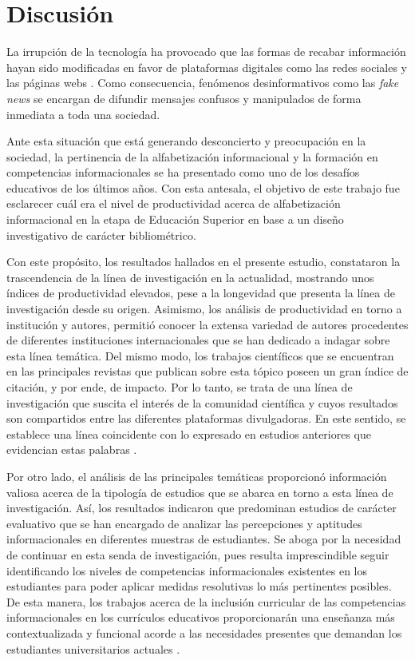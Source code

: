 \documentclass[spanish]{textolivre}
\begin{document}
\section{Discusión}
La irrupción de la tecnología ha provocado que las formas de recabar información hayan sido modificadas en favor de  plataformas digitales como las redes sociales y las páginas webs \cite{alonsoelat2020}. %
Como consecuencia, fenómenos desinformativos como las \emph{fake news} se encargan de difundir mensajes confusos y manipulados de forma inmediata a toda una sociedad.

Ante esta situación que está generando desconcierto y preocupación en la sociedad, la pertinencia de la alfabetización informacional y la formación en competencias informacionales se ha presentado como uno de los desafíos educativos de los últimos años. Con esta antesala, el objetivo de este trabajo fue esclarecer cuál era el nivel de productividad acerca de alfabetización informacional en la etapa de Educación Superior en base a un diseño investigativo de carácter bibliométrico.

Con este propósito, los resultados hallados en el presente estudio, constataron la trascendencia de la línea de investigación en la actualidad, mostrando unos índices de productividad elevados, pese a la longevidad que presenta la línea de investigación desde su origen. Asimismo, los análisis de productividad en torno a institución y autores, permitió conocer la extensa variedad de autores procedentes de diferentes instituciones internacionales que se han dedicado a indagar sobre esta línea temática. Del mismo modo, los trabajos científicos que se encuentran en las principales revistas que publican sobre esta tópico poseen un gran índice de citación, y por ende, de impacto. Por lo tanto, se trata de una línea de investigación que suscita el interés de la comunidad científica y cuyos resultados son compartidos entre las diferentes plataformas divulgadoras. En este sentido, se establece una línea coincidente con lo expresado en estudios anteriores que evidencian estas palabras \cite{demeulemeesteretal2019, demeulemeester2018}. %

Por otro lado, el análisis de las principales temáticas proporcionó información valiosa acerca de la tipología de estudios que se abarca en torno a esta línea de investigación. Así, los resultados indicaron que predominan estudios de carácter evaluativo que se han encargado de analizar las percepciones y aptitudes informacionales en diferentes muestras de estudiantes. Se aboga por la necesidad de continuar en esta senda de investigación, pues resulta imprescindible seguir identificando los niveles de competencias informacionales existentes en los estudiantes para poder aplicar medidas resolutivas lo más pertinentes posibles. De esta manera, los trabajos acerca de la inclusión curricular de las competencias informacionales en los currículos educativos proporcionarán una enseñanza más contextualizada y funcional acorde a las necesidades presentes que demandan los estudiantes universitarios actuales \cite{ball2019, george2019}. %
\end{document}
